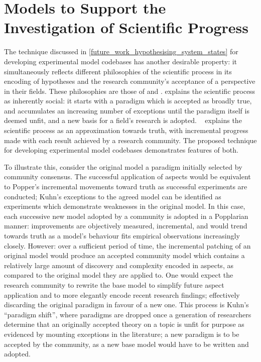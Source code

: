 \section{\AspectOriented Models to Support the Investigation of Scientific Progress}

The technique discussed in \cref{future_work_hypothesising_system_states} for
developing experimental model codebases has another desirable property: it
simultaneously reflects different philosophies of the scientific process in its
encoding of hypotheses and the research community's acceptance of a perspective
in their fields. These philosophies are those of \citeauthor{kuhn2012structure}
and \citeauthor{popper1972theoryevolution}. \citet{kuhn2012structure} explains
the scientific process as inherently social: it starts with a paradigm which is
accepted as broadly true, and accumulates an increasing number of exceptions
until the paradigm itself is deemed unfit, and a new basis for a field's
research is adopted.
\citeauthor{popper1972theoryevolution}~\cite{popper1972theoryevolution} explains
the scientific process as an approximation towards truth, with incremental
progress made with each result achieved by a research community. The proposed
technique for developing experimental model codebases demonstrates features of
both.

To illustrate this, consider the original model a paradigm initially selected by
community consensus. The successful application of aspects would be equivalent
to Popper's incremental movements toward truth as successful experiments are
conducted; Kuhn's exceptions to the agreed model can be identified as
experiments which demonstrate weaknesses in the original model. In this case,
each successive new model adopted by a community is adopted in a Popplarian
manner: improvements are objectively measured, incremental, and would trend
towards truth as a model's behaviour fits empirical observations increasingly
closely. However: over a sufficient period of time, the incremental patching of
an original model would produce an accepted community model which contains a
relatively large amount of discovery and complexity encoded in aspects, as
compared to the original model they are applied to. One would expect the
research community to rewrite the base model to simplify future aspect
application and to more elegantly encode recent research findings; effectively
discarding the original paradigm in favour of a new one. This process is Kuhn's
``paradigm shift'', where paradigms are dropped once a generation of researchers
determine that an originally accepted theory on a topic is unfit for purpose as
evidenced by mounting exceptions in the literature; a new paradigm is to be
accepted by the community, as a new base model would have to be written and
adopted.

